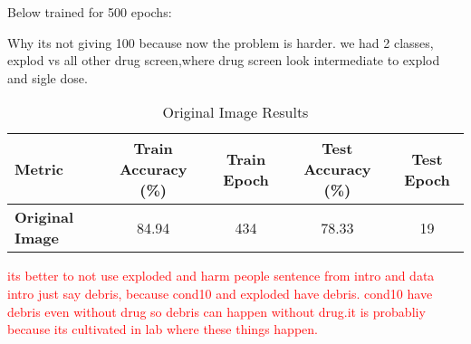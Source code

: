 Below trained for 500 epochs:

\begin{table}[h!]
  \centering
  \caption{Performance metrics for different augmentation strategies before the projection head.}
  \label{tab:augmentation_metrics}
\end{table}


Why its not giving 100 because now the problem is harder. we had 2 classes, explod vs all other drug screen,where drug screen look intermediate to explod and sigle dose.


\begin{table}[h!]
  \centering
  \caption{Original Image Results}
  \label{tab:original_image_results}
  \begin{tabular}{lcccc}
  \toprule
  \textbf{Metric}         & \textbf{Train Accuracy (\%)} & \textbf{Train Epoch} & \textbf{Test Accuracy (\%)} & \textbf{Test Epoch} \\ \midrule
  \textbf{Original Image} & 84.94                        & 434                   & 78.33                        & 19                  \\ 
  \bottomrule
  \end{tabular}
\end{table}

\textcolor{red}{its better to not use exploded and harm people sentence from intro and data intro just say debris, because cond10 and exploded have debris. cond10 
have debris even without drug so debris can happen without drug.it is probabliy because its cultivated in lab where these things happen.} 